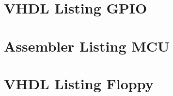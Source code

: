 \begin{appendix}

\section{VHDL Listing GPIO}

\clearpage

\section{Assembler Listing MCU}

\clearpage

\section{VHDL Listing Floppy}

\end{appendix}
